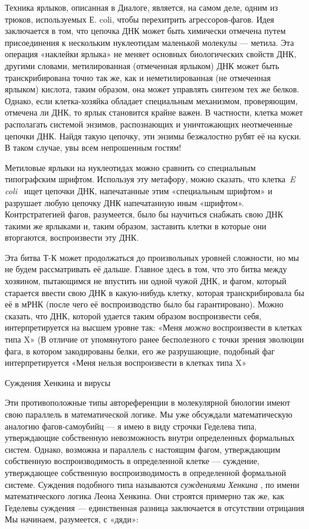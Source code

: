 \documentclass[../main.tex]{subfiles}
\begin{document}
Техника ярлыков, описанная в Диалоге, является, на самом деле, одним из трюков, используемых Е. coli, чтобы перехитрить агрессоров-фагов. Идея заключается в том, что цепочка ДНК может быть химически отмечена путем присоединения к нескольким нуклеотидам маленькой молекулы --- метила. Эта операция «наклейки ярлыка» не меняет основных биологических свойств ДНК, другими словами, метилированная (отмеченная ярлыком) ДНК может быть транскрибирована точно так же, как и неметилированная (не отмеченная ярлыком) кислота, таким образом, она может управлять синтезом тех же белков. Однако, если клетка-хозяйка обладает специальным механизмом, проверяющим, отмечена ли ДНК, то ярлык становится крайне важен. В частности, клетка может располагать системой энзимов, распознающих и уничтожающих неотмеченные цепочки ДНК\@. Найдя такую цепочку, эти энзимы безжалостно рубят её на куски. В таком случае, увы всем непрошенным гостям!

Метиловые ярлыки на нуклеотидах можно сравнить со специальным типографским шрифтом. Используя эту метафору, можно сказать, что клетка~\emph{E coli} ~ищет цепочки ДНК, напечатанные этим «специальным шрифтом» и разрушает любую цепочку ДНК напечатанную иным «шрифтом». Контрстратегией фагов, разумеется, было бы научиться снабжать свою ДНК такими же ярлыками и, таким образом, заставить клетки в которые они вторгаются, воспроизвести эту ДНК.

Эта битва Т-К может продолжаться до произвольных уровней сложности, но мы не будем рассматривать её дальше. Главное здесь в том, что это битва между хозяином, пытающимся не впустить ни одной чужой ДНК, и фагом, который старается ввести свою ДНК в какую-нибудь клетку, которая транскрибировала бы её в мРНК (после чего её воспроизводство было бы гарантировано). Можно сказать, что ДНК, которой удается таким образом воспроизвести себя, интерпретируется на высшем уровне так: «Меня \emph{можно} воспроизвести в клетках типа X» (В отличие от упомянутого ранее бесполезного с точки зрения эволюции фага, в котором закодированы белки, его же разрушающие, подобный фаг интерпретируется «Меня нельзя воспроизвести в клетках типа X»

Суждения Хенкина и вирусы

Эти противоположные типы автореференции в молекулярной биологии имеют свою параллель в математической логике. Мы уже обсуждали математическую аналогию фагов-самоубийц --- я имею в виду строчки Геделева типа, утверждающие собственную невозможность внутри определенных формальных систем. Однако, возможна и параллель с настоящим фагом, утверждающим собственную воспроизводимость в определенной клетке --- суждение, утверждающее собственную воспроизводимость в определенной формальной системе. Суждения подобного типа называются \emph{суждениями Хенкина} , по имени математического логика Леона Хенкина. Они строятся примерно так же, как Геделевы суждения --- единственная разница заключается в отсутствии отрицания Мы начинаем, разумеется, с «дяди»:
\end{document}
